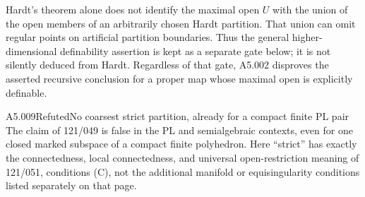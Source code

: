 Hardt's theorem alone does not identify the maximal open $U$ with
the union of the open members of an arbitrarily chosen Hardt
partition.  That union can omit regular points on artificial
partition boundaries.  Thus the general higher-dimensional
definability assertion is kept as a separate gate below; it is
not silently deduced from Hardt.  Regardless of that gate, A5.002
disproves the asserted recursive conclusion for a proper map
whose maximal open is explicitly definable.

\begin{saresult}{A5.009}{Refuted}{No coarsest strict partition, already for a compact finite PL pair}
The claim of 121/049 is false in the PL and semialgebraic contexts,
even for one closed marked subspace of a compact finite polyhedron.
Here ``strict'' has exactly the connectedness, local connectedness,
and universal open-restriction meaning of 121/051, conditions (C),
not the additional manifold or equisingularity conditions listed
separately on that page.
\end{saresult}
